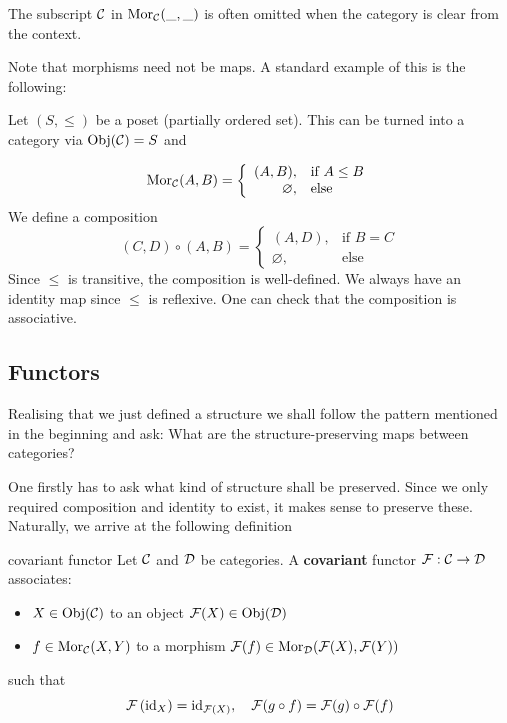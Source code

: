 \documentclass[twoside = false,	%
		headsepline,		%
		parskip = true,
		]{scrbook}						%
\begin{document}
    \begin{remark*}{}
        The subscript $\mathcal C$ in $\mathrm{Mor}_\mathcal C(\_,\_)$ is often omitted when the category is clear from the context.
    \end{remark*}
    
    Note that morphisms need not be maps. A standard example of this is the following:

    \begin{example*}{}
        Let $(S,\leq)$ be a poset (partially ordered set). This can be turned into a category via $\mathrm{Obj}(\mathcal C) = S$ and
        
        \begin{equation*}
            \mathrm{Mor}_{\mathcal C}(A,B) = \left\{ \begin{array}{rl}
                (A,B), & \text{if } A \leq B  \\
                \varnothing, & \text{else} 
            \end{array} \right.
        \end{equation*}
        We define a composition
        \begin{equation*}
            (C,D) \circ (A,B) = \left\{ \begin{array}{rl}
                (A,D), & \text{if } B = C  \\
                \varnothing, & \text{else} 
            \end{array}\right.
        \end{equation*}
        Since $\leq$ is transitive, the composition is well-defined.
        We always have an identity map since $\leq$ is reflexive. One can check that the composition is associative.
    \end{example*}
    
\subsection{Functors}\label{functors}
    Realising that we just defined a structure we shall follow the pattern mentioned in the beginning and ask:
    What are the structure-preserving maps between categories?

    One firstly has to ask what kind of structure shall be preserved. Since we only required composition and
    identity to exist, it makes sense to preserve these. Naturally, we arrive at the following definition 

    \begin{definition*}{covariant functor}
        Let $\mathcal C$ and $\mathcal D$ be categories. A \textbf{covariant} functor $\mathcal F: \mathcal C \to \mathcal D$ associates:
        \begin{itemize}
            \item $X \in \mathrm{Obj}(\mathcal C)$ to an object $\mathcal F(X) \in \mathrm{Obj}(\mathcal D)$
            \item $f \in \mathrm{Mor}_\mathcal C(X,Y)$ to a morphism $\mathcal F(f) \in \mathrm{Mor}_\mathcal D(\mathcal F(X),\mathcal F(Y))$
        \end{itemize}
        such that
        \begin{equation*}
            \mathcal F\left( \mathrm{id}_X\right) = \mathrm{id}_{\mathcal F(X)}, \quad \mathcal F(g \circ f) = \mathcal F(g) \circ \mathcal F(f)
        \end{equation*}
    \end{definition*}
\end{document}
